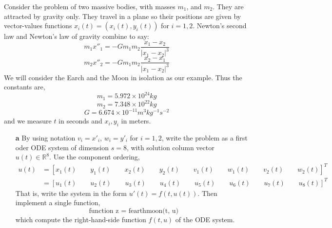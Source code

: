 \documentclass[12pt]{article}
\makeatletter
\theoremstyle{homework}
\newenvironment{exercise}[1]
{\def\@currentlabel{#1}\exercisecore}
{\endexercisecore}
\newcommand{\Reals}{\ensuremath{\mathbb R}}
\let\RR\Reals
\makeatother
\begin{document}
\begin{exercise}{Problem P29} Consider the problem of two massive bodies, with masses $m_1$, 
  and $m_2$. They are attracted by gravity only. They travel in a plane so their positions are 
  given by vector-values functions $x_i(t) = (x_i(t), y_i(t))$ for $i = 1, 2$. Newton's second 
  law and Newton's law of gravity combine to say:
  \begin{equation*}
    m_1x''_1 = -Gm_1m_2\frac{x_1 - x_2}{|x_1 - x_2|^3}
  \end{equation*}
  \begin{equation*}
    m_2x''_2 = -Gm_1m_2\frac{x_2 - x_1}{|x_1 - x_2|^3}
  \end{equation*}
  We will consider the Earch and the Moon in isolation as our example. Thus the 
  constants are, 
  \begin{equation*}
    m_1 = 5.972 \times 10^{24} kg
  \end{equation*}
  \begin{equation*}
    m_2 = 7.348 \times 10^{22} kg
  \end{equation*}
  \begin{equation*}
    G = 6.674 \times 10^{-11} m^3kg^{-1}s^{-2}
  \end{equation*}
  and we measure $t$ in seconds and $x_i,y_i$ in meters. 
  
  \begin{enumerate}
    \item[\textbf{a}] By using notation $v_i = x'_i$, $w_i = y'_i$ for $i = 1, 2$, write 
    the problem as a first oder ODE system of dimension $s = 8$, with solution column vector $u(t) \in \RR^8$. 
    Use the component ordering,
    \begin{align*}
      u(t) &= [x_1(t) \qquad y_1(t) \qquad x_2(t) \qquad y_2(t)\qquad v_1(t) \qquad w_1(t) \qquad v_2(t) \qquad w_2(t)]^T\\
        &= [u_1(t) \qquad u_2(t) \qquad u_3(t) \qquad u_4(t) \qquad u_5(t) \qquad u_6(t) \qquad u_7(t) \qquad u_8(t)]^T
    \end{align*}
    That is, write the system in the form $u'(t) = f(t, u(t))$. Then implement a single function, 
    \begin{equation*}
      \text{ function z = fearthmoon(t, u)}
    \end{equation*}
    which compute the right-hand-side function $f(t, u)$ of the ODE system. 
  

\end{enumerate}
\end{exercise}
\end{document}
